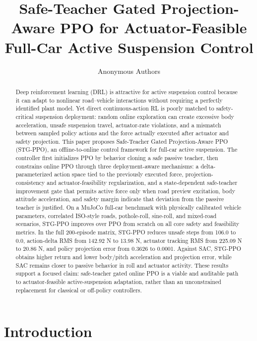 \documentclass[letterpaper,twocolumn]{article}
\title{Safe-Teacher Gated Projection-Aware PPO for Actuator-Feasible Full-Car Active Suspension Control}
\author{Anonymous Authors}
\date{}
\begin{document}
\maketitle

\begin{abstract}
Deep reinforcement learning (DRL) is attractive for active suspension control because it can adapt to nonlinear road--vehicle interactions without requiring a perfectly identified plant model.
Yet direct continuous-action RL is poorly matched to safety-critical suspension deployment: random online exploration can create excessive body acceleration, unsafe suspension travel, actuator-rate violations, and a mismatch between sampled policy actions and the force actually executed after actuator and safety projection.
This paper proposes Safe-Teacher Gated Projection-Aware PPO (STG-PPO), an offline-to-online control framework for full-car active suspension.
The controller first initializes PPO by behavior cloning a safe passive teacher, then constrains online PPO through three deployment-aware mechanisms: a delta-parameterized action space tied to the previously executed force, projection-consistency and actuator-feasibility regularization, and a state-dependent safe-teacher improvement gate that permits active force only when road preview excitation, body attitude acceleration, and safety margin indicate that deviation from the passive teacher is justified.
On a MuJoCo full-car benchmark with physically calibrated vehicle parameters, correlated ISO-style roads, pothole-roll, sine-roll, and mixed-road scenarios, STG-PPO improves over PPO from scratch on all core safety and feasibility metrics.
In the full 200-episode matrix, STG-PPO reduces unsafe steps from 106.0 to 0.0, action-delta RMS from 142.92 N to 13.98 N, actuator tracking RMS from 225.09 N to 20.86 N, and policy projection error from 0.3626 to 0.0001.
Against SAC, STG-PPO obtains higher return and lower body/pitch acceleration and projection error, while SAC remains closer to passive behavior in roll and actuator activity.
These results support a focused claim: safe-teacher gated online PPO is a viable and auditable path to actuator-feasible active-suspension adaptation, rather than an unconstrained replacement for classical or off-policy controllers.
\end{abstract}

\section{Introduction}
\end{document}
